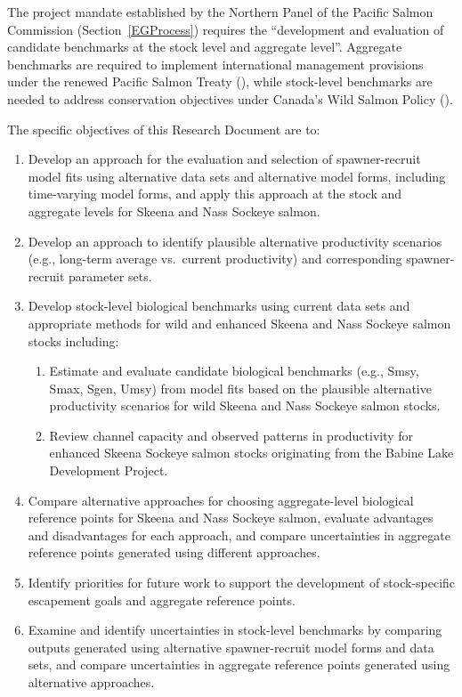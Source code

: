 \documentclass[french,11pt]{book}
\begin{document}
The project mandate established by the Northern Panel of the Pacific Salmon Commission (Section~\ref{EGProcess}) requires the ``development and evaluation of candidate benchmarks at the stock level and aggregate level''. Aggregate benchmarks are required to implement international management provisions under the renewed Pacific Salmon Treaty (), while stock-level benchmarks are needed to address conservation objectives under Canada's Wild Salmon Policy ().

The specific objectives of this Research Document are to:
\begin{enumerate}
\def\labelenumi{\arabic{enumi}.}

\item
  Develop an approach for the evaluation and selection of spawner-recruit model fits using alternative data sets and alternative model forms, including time-varying model forms, and apply this approach at the stock and aggregate levels for Skeena and Nass Sockeye salmon.
\item
  Develop an approach to identify plausible alternative productivity scenarios (e.g., long-term average vs.~current productivity) and corresponding spawner-recruit parameter sets.
\item
  Develop stock-level biological benchmarks using current data sets and appropriate methods for wild and enhanced Skeena and Nass Sockeye salmon stocks including:
  \begin{enumerate}
  \def\labelenumii{\alph{enumii}.}

  \item
    Estimate and evaluate candidate biological benchmarks (e.g., Smsy, Smax, Sgen, Umsy) from model fits based on the plausible alternative productivity scenarios for wild Skeena and Nass Sockeye salmon stocks.
  \item
    Review channel capacity and observed patterns in productivity for enhanced Skeena Sockeye salmon stocks originating from the Babine Lake Development Project.
  \end{enumerate}
\item
  Compare alternative approaches for choosing aggregate-level biological reference points for Skeena and Nass Sockeye salmon, evaluate advantages and disadvantages for each approach, and compare uncertainties in aggregate reference points generated using different approaches.
\item
  Identify priorities for future work to support the development of stock-specific escapement goals and aggregate reference points.
\item
  Examine and identify uncertainties in stock-level benchmarks by comparing outputs generated using alternative spawner-recruit model forms and data sets, and compare uncertainties in aggregate reference points generated using alternative approaches.
\end{enumerate}
\end{document}
